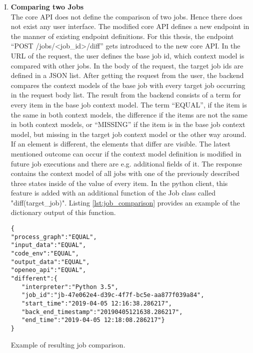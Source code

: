 \documentclass[draft,final]{vutinfth} %
\begin{document}
\begin{enumerate}[I.]
\item \textbf{Comparing two Jobs} \\
	The core API does not define the comparison of two jobs. Hence there does not exist any user interface. The modified core API defines a new endpoint in the manner of existing endpoint definitions. For this thesis, the endpoint  “POST /jobs/<job\_id>/diff” gets introduced to the new core API. In the URL of the request, the user defines the base job id, which context model is compared with other jobs. In the body of the request, the target job ids are defined in a JSON list. After getting the request from the user, the backend compares the context models of the base job with every target job occurring in the request body list. The result from the backend consists of a term for every item in the base job context model. The term “EQUAL”, if the item is the same in both context models, the difference if the items are not the same in both context models, or “MISSING” if the item is in the base job context model, but missing in the target job context model or the other way around. If an element is different, the elements that differ are visible. The latest mentioned outcome can occur if the context model definition is modified in future job executions and there are e.g. additional fields of it. The response contains the context model of all jobs with one of the previously described three states inside of the value of every item. In the python client, this feature is added with an additional function of the Job class called "diff(target\_job)". Listing \ref{lst:job_comparison} provides an example of the dictionary output of this function.

\begin{listing}[ht]
	\begin{verbatim}
{
"process_graph":"EQUAL",
"input_data":"EQUAL",
"code_env":"EQUAL",
"output_data":"EQUAL",
"openeo_api":"EQUAL",
"different":{
   "interpreter":"Python 3.5",
   "job_id":"jb-47e062e4-d39c-4f7f-bc5e-aa877f039a84",
   "start_time":"2019-04-05 12:16:38.286217",
   "back_end_timestamp":"20190405121638.286217",
   "end_time":"2019-04-05 12:18:08.286217"}
}
	\end{verbatim}
	\caption{Example of resulting job comparison.}
	\label{lst:job_comparison}
\end{listing}	



\end{enumerate}
\end{document}
